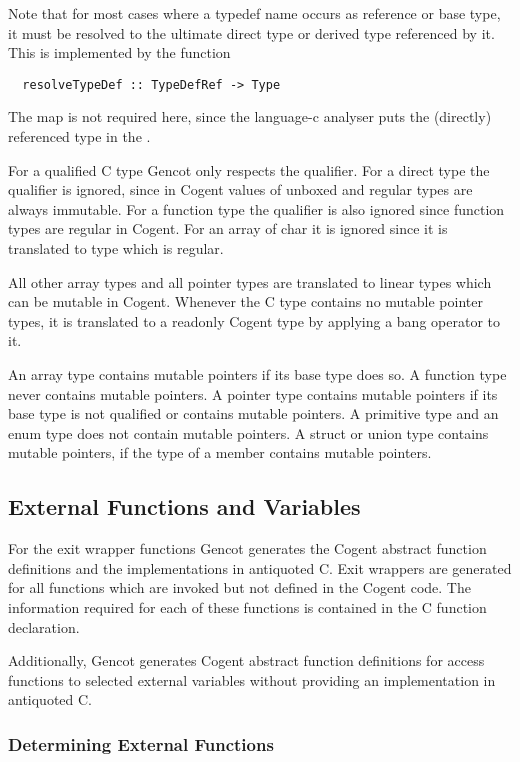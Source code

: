 Note that for most cases where a typedef name occurs as reference or base type, it must be resolved to
the ultimate direct type or derived type referenced by it. This is implemented by the function
\begin{verbatim}
  resolveTypeDef :: TypeDefRef -> Type 
\end{verbatim}
The  map is not required here, since the language-c analyser puts the (directly) 
referenced type in the . 

For a qualified C type Gencot only respects the  qualifier. For a direct type the 
qualifier is ignored, since in Cogent values of unboxed and regular types are always immutable. For
a function type the qualifier is also ignored since function types are regular in Cogent. For an array
of char it is ignored since it is translated to type  which is regular.

All other array types and all pointer types are translated to linear types which can be mutable in
Cogent. Whenever the C type contains no mutable pointer types, it is translated to a readonly Cogent type by 
applying a bang operator to it.

An array type contains mutable pointers if its base type does so. A function type never contains mutable pointers.
A pointer type contains mutable pointers if its base type is not  qualified or contains mutable pointers.
A primitive type and an enum type does not contain mutable pointers. A struct or union type contains mutable 
pointers, if the type of a member contains mutable pointers.

\subsection{External Functions and Variables}
\label{impl-ccomps-externs}

For the exit wrapper functions Gencot generates the Cogent abstract function definitions and the implementations
in antiquoted C. Exit wrappers are generated for all functions which are invoked but not defined in the Cogent code. 
The information required for each of these functions is contained in the C function declaration.

Additionally, Gencot generates Cogent abstract function definitions for access functions to selected external
variables without providing an implementation in antiquoted C.

\subsubsection{Determining External Functions}

